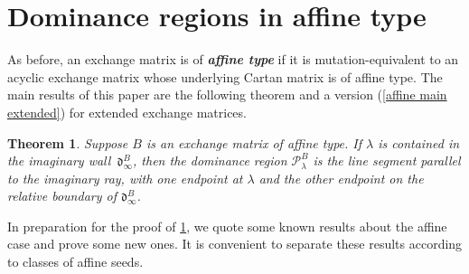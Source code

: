 \documentclass{amsart}
\newtheorem{theorem}[proposition]{Theorem}
\theoremstyle{definition}
\theoremstyle{remark}
\numberwithin{equation}{section}
\newcommand{\newword}[1]{\textbf{\emph{#1}}}
\newcommand{\set}[1]{{\left\lbrace #1 \right\rbrace}}
\newcommand{\0}{{\mathbf{0}}}
\newcommand{\kk}{\mathbf{k}}
\newcommand{\tB}{{\tilde{B}}}
\newcommand{\BB}{\mathbf{B}}
\renewcommand{\P}{\mathcal{P}}
\renewcommand{\d}{{\mathfrak d}}
\newcommand{\sayN}[1]{\say[N]{#1}}
\begin{document}
%


\section{Dominance regions in affine type}
As before, an exchange matrix is of \newword{affine type} if it is mutation-equivalent to an acyclic exchange matrix whose underlying Cartan matrix is of affine type.
The main results of this paper are the following theorem and a version (\cref{affine main extended}) for extended exchange matrices. \sayN{hopefully}

\begin{theorem}\label{affine main}
Suppose $B$ is an exchange matrix of affine type.
If $\lambda$ is contained in the imaginary wall~$\d^B_\infty$, then the dominance region $\P^B_\lambda$ is the line segment parallel to the imaginary ray, with one endpoint at $\lambda$ and the other endpoint on the relative boundary of $\d^B_\infty$.
\end{theorem}

In preparation for the proof of \cref{affine main}, we quote some known results about the affine case and prove some new ones.
It is convenient to separate these results according to classes of affine seeds.
\end{document}

